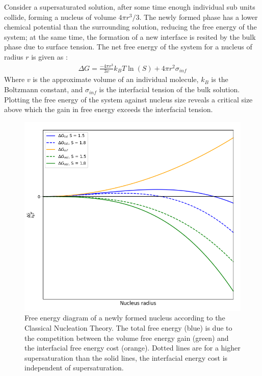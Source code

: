 Consider a supersaturated solution, after some time enough individual
sub units collide, forming a nucleus of volume $4\pi r^3/3$. 
The newly formed phase has a lower chemical potential than the 
surrounding solution, reducing the free energy of the system; 
at the same time, the formation of a new interface is resited 
by the bulk phase due to surface tension. The net free energy 
of the system for a nucleus of radius $r$ is given as \cite{Karthika2016}:
\begin{align}
	\Delta G = \frac{-4\pi r^3}{3v}k_BT\ln(S) + 4\pi r^{2}\sigma_{inf} 
\end{align}
Where $v$ is the approximate volume of an individual molecule, $k_B$
is the Boltzmann constant, and $\sigma_{inf}$ is the interfacial 
tension of the bulk solution. Plotting the free energy of the system
against nucleus size reveals a critical size above which the gain 
in free energy exceeds the interfacial tension. 
\begin{figure}[h!]
	\label{fig:free_energy}
	\centering
	\includegraphics[width=\linewidth]{Free_Energy_Diagram.png}
	\caption{Free energy diagram of a newly formed nucleus according 
		     to the Classical Nucleation Theory. The total free energy (blue)
		     is due to the competition between the volume free energy gain
		     (green) and the interfacial free energy cost (orange). Dotted
		     lines are for a higher supersaturation than the solid lines,
		     the interfacial energy cost is independent of supersaturation.}
\end{figure}

